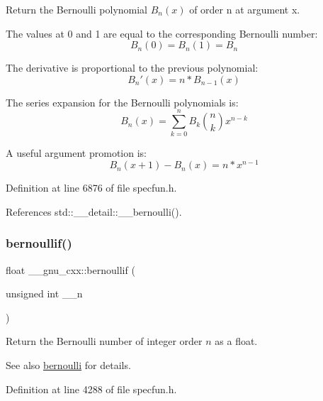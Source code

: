 Return the Bernoulli polynomial $ B_n(x) $ of order n at argument x.

The values at 0 and 1 are equal to the corresponding Bernoulli number\+: \[ B_n(0) = B_n(1) = B_n \]

The derivative is proportional to the previous polynomial\+: \[ B_n'(x) = n * B_{n-1}(x) \]

The series expansion for the Bernoulli polynomials is\+: \[ B_n(x) = \sum_{k=0}^{n} B_k \binom{n}{k} x^{n-k} \]

A useful argument promotion is\+: \[ B_n(x+1) - B_n(x) = n * x^{n-1} \] 

Definition at line 6876 of file specfun.\+h.



References std\+::\+\_\+\+\_\+detail\+::\+\_\+\+\_\+bernoulli().

\mbox{\label{group__gnu__math__spec__func_gabcd77f012ae74989c4bb9ca61978481d}} 
\subsubsection{\texorpdfstring{bernoullif()}{bernoullif()}}
{\footnotesize\ttfamily float \+\_\+\+\_\+gnu\+\_\+cxx\+::bernoullif (\begin{DoxyParamCaption}\item[{unsigned int}]{\+\_\+\+\_\+n }\end{DoxyParamCaption})\hspace{0.3cm}{\ttfamily [inline]}}

Return the Bernoulli number of integer order $ n $ as a {\ttfamily float}.

\begin{DoxySeeAlso}{See also}
\hyperlink{group__gnu__math__spec__func_gad339f0011df1967ec6c9e55bd1547bf4}{bernoulli} for details. 
\end{DoxySeeAlso}


Definition at line 4288 of file specfun.\+h.

\mbox{\label{group__gnu__math__spec__func_gaac8f04abfdd6b744d11cb73ec1f564b1}} 
